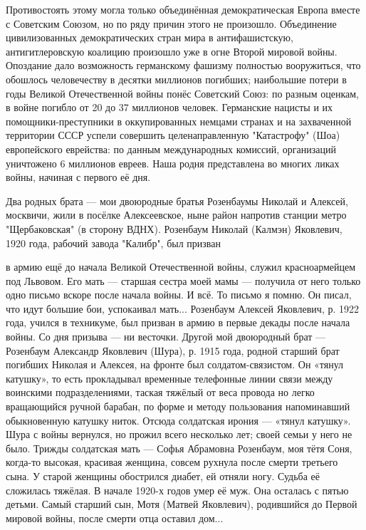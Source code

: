 \label{27-1}
Противостоять этому могла только объединённая демократическая Европа вместе с Советским Союзом, но по ряду причин этого не произошло. Объединение цивилизованных демократических стран мира в антифашистскую, антигитлеровскую коалицию произошло уже в огне Второй мировой войны. Опоздание дало возможность германскому фашизму полностью вооружиться, что обошлось человечеству в десятки миллионов погибших; наибольшие потери в годы Великой Отечественной войны понёс Советский Союз: по разным оценкам, в войне погибло от 20 до 37 миллионов человек. Германские нацисты и их помощники-преступники в оккупированных немцами странах и на захваченной территории СССР успели совершить целенаправленную "Катастрофу" (Шоа) европейского еврейства: по данным международных комиссий, организаций уничтожено 6 миллионов евреев. Наша родня представлена во многих ликах войны, начиная с первого её дня. 

Два родных брата — мои двоюродные братья Розенбаумы Николай и Алексей, москвичи, жили в посёлке Алексеевское, ныне район напротив станции метро "Щербаковская" (в сторону ВДНХ). Розенбаум Николай (Калмэн) Яковлевич, 1920 года, рабочий завода "Калибр", был призван 

\label{28-1}
в армию ещё до начала Великой Отечественной войны, служил красноармейцем под Львовом. Его мать — старшая сестра моей мамы — получила от него только одно письмо вскоре после начала войны. И всё. То письмо я помню. Он писал, что идут большие бои, успокаивал мать... 
Розенбаум Алексей Яковлевич, р. 1922 года, учился в техникуме, был призван в армию в первые декады после начала войны. Со дня призыва — ни весточки. 
Другой мой двоюродный брат — Розенбаум Александр Яковлевич (Шура), р. 1915 года, родной старший брат погибших Николая и Алексея, на фронте был солдатом-связистом. Он «тянул катушку», то есть прокладывал временные телефонные линии связи между воинскими подразделениями, таская тяжёлый от веса провода но легко вращающийся ручной барабан, по форме и методу пользования напоминавший обыкновенную катушку ниток. Отсюда солдатская ирония — «тянул катушку». Шура с войны вернулся, но прожил всего несколько лет; своей семьи у него не было. 
Трижды солдатская мать — Софья Абрамовна Розенбаум, моя тётя Соня, когда-то высокая, красивая женщина, совсем рухнула после смерти третьего сына. У старой женщины обострился диабет, ей отняли ногу. Судьба её сложилась тяжёлая. В начале 1920-х годов умер её муж. Она осталась с пятью детьми. Самый старший сын, Мотя (Матвей Яковлевич), родившийся до Первой мировой войны, после смерти отца оставил дом...

